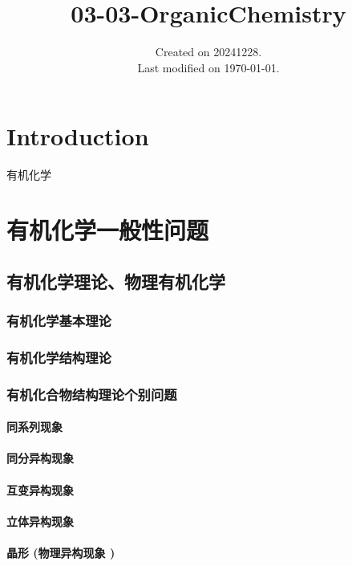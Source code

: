\documentclass[UTF8]{../03-Chemistry}
\begin{document}
\title{03-03-OrganicChemistry}
\date{Created on 20241228.\\   Last modified on \today.}
\maketitle
\tableofcontents


\chapter{Introduction}
有机化学




\chapter{有机化学一般性问题}

\section{有机化学理论、物理有机化学}
    \subsection{有机化学基本理论}
    \subsection{有机化学结构理论}
    \subsection{有机化合物结构理论个别问题}
        \subsubsection{同系列现象}
        \subsubsection{同分异构现象}
        \subsubsection{互变异构现象}
        \subsubsection{立体异构现象}
        \subsubsection{晶形 (物理异构现象 )}
\end{document}
